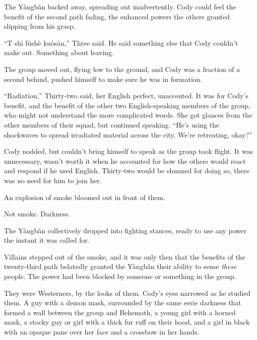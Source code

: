 The Y\`{a}ngb\v{a}n backed away, spreading out inadvertently.  Cody could feel the benefit of the second path fading, the enhanced powers the others granted slipping from his grasp.



``T sh\`{i} f\'{u}sh\`{e} ku\`{o}s\`{a}n,'' Three said.  He said something else that Cody couldn't make out.  Something about leaving.



The group moved out, flying low to the ground, and Cody was a fraction of a second behind, pushed himself to make sure he was in formation.



``Radiation,'' Thirty-two said, her English perfect, unaccented.  It was for Cody's benefit, and the benefit of the other two English-speaking members of the group, who might not understand the more complicated words.  She got glances from the other members of their squad, but continued speaking.  ``He's using the shockwaves to spread irradiated material across the city.  We're retreating, okay?''



Cody nodded, but couldn't bring himself to speak as the group took flight.  It was unnecessary, wasn't worth it when he accounted for how the others would react and respond if he used English.  Thirty-two would be shunned for doing so, there was no need for him to join her.



An explosion of smoke bloomed out in front of them.



Not smoke.  Darkness.



The Y\`{a}ngb\v{a}n collectively dropped into fighting stances, ready to use any power the instant it was called for.



Villains stepped out of the smoke, and it was only then that the benefits of the twenty-third path belatedly granted the Y\`{a}ngb\v{a}n their ability to sense \emph{these} people.  The power had been blocked by someone or something in the group.



They were Westerners, by the looks of them.  Cody's eyes narrowed as he studied them.  A guy with a demon mask, surrounded by the same eerie darkness that formed a wall between the group and Behemoth, a young girl with a horned mask, a stocky guy or girl with a thick fur ruff on their hood, and a girl in black with an opaque pane over her face and a crossbow in her hands.



